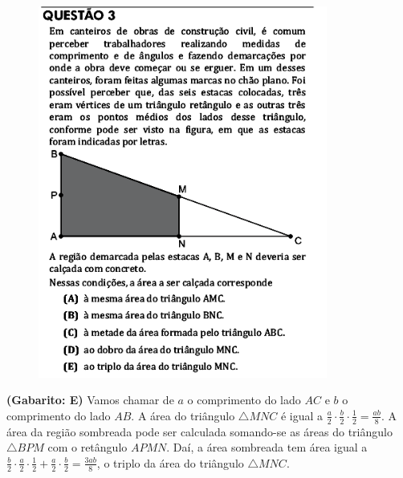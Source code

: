 \documentclass[a4paper]{article}
\begin{document}
\begin{figure}[H]
	\begin{center}
		\includegraphics[width=9.5cm]{L5Q3.png}
	\end{center}
\end{figure}
\par\textbf{(Gabarito: E)} Vamos chamar de $a$ o comprimento do lado $AC$ e $b$ o comprimento do lado $AB$. A área do triângulo $\triangle MNC$ é igual a $\displaystyle{ \frac{a}{2}\cdot\frac{b}{2}\cdot\frac{1}{2} = \frac{ab}{8} }$. A área da região sombreada pode ser calculada somando-se as áreas do triângulo $\triangle BPM$ com o retângulo $APMN$. Daí, a área sombreada tem área igual a $ \displaystyle{  \frac{b}{2}\cdot\frac{a}{2}\cdot\frac{1}{2} + \frac{a}{2}\cdot\frac{b}{2} = \frac{3ab}{8}  }  $, o triplo da área do triângulo $\triangle MNC$.
\end{document}

